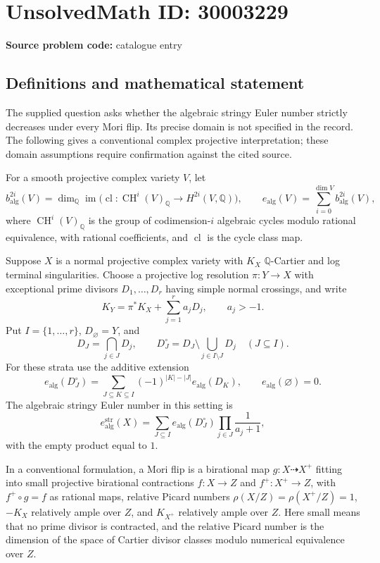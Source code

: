 \documentclass[11pt]{article}
\newcommand{\Q}{\mathbb{Q}}
\begin{document}
\section*{UnsolvedMath ID: 30003229}
\textbf{Source problem code:} catalogue entry
\subsection{Definitions and mathematical statement}
The supplied question asks whether the algebraic stringy Euler number strictly decreases under every Mori flip. Its precise domain is not specified in the record. The following gives a conventional complex projective interpretation; these domain assumptions require confirmation against the cited source.

For a smooth projective complex variety \(V\), let
\[
 b_{\mathrm{alg}}^{2i}(V)=\dim_{\Q}\operatorname{im}\bigl(\operatorname{cl}:\operatorname{CH}^{i}(V)_{\Q}\longrightarrow H^{2i}(V,\Q)\bigr),
 \qquad
 e_{\mathrm{alg}}(V)=\sum_{i=0}^{\dim V}b_{\mathrm{alg}}^{2i}(V),
\]
where \(\operatorname{CH}^{i}(V)_{\Q}\) is the group of codimension-\(i\) algebraic cycles modulo rational equivalence, with rational coefficients, and \(\operatorname{cl}\) is the cycle class map.

Suppose \(X\) is a normal projective complex variety with \(K_X\) \(\Q\)-Cartier and log terminal singularities. Choose a projective log resolution \(\pi:Y\to X\) with exceptional prime divisors \(D_1,\ldots,D_r\) having simple normal crossings, and write
\[
 K_Y=\pi^*K_X+\sum_{j=1}^{r}a_jD_j,\qquad a_j>-1.
\]
Put \(I=\{1,\ldots,r\}\), \(D_{\varnothing}=Y\), and
\[
 D_J=\bigcap_{j\in J}D_j,\qquad
 D_J^{\circ}=D_J\setminus\bigcup_{j\in I\setminus J}D_j
 \quad(J\subseteq I).
\]
For these strata use the additive extension
\[
 e_{\mathrm{alg}}(D_J^{\circ})
 =\sum_{J\subseteq K\subseteq I}(-1)^{|K|-|J|}e_{\mathrm{alg}}(D_K),
 \qquad e_{\mathrm{alg}}(\varnothing)=0.
\]
The algebraic stringy Euler number in this setting is
\[
 e_{\mathrm{alg}}^{\mathrm{str}}(X)
 =\sum_{J\subseteq I}e_{\mathrm{alg}}(D_J^{\circ})
   \prod_{j\in J}\frac{1}{a_j+1},
\]
with the empty product equal to \(1\).

In a conventional formulation, a Mori flip is a birational map \(g:X\dashrightarrow X^+\) fitting into small projective birational contractions \(f:X\to Z\) and \(f^+:X^+\to Z\), with \(f^+\circ g=f\) as rational maps, relative Picard numbers \(\rho(X/Z)=\rho(X^+/Z)=1\), \(-K_X\) relatively ample over \(Z\), and \(K_{X^+}\) relatively ample over \(Z\). Here small means that no prime divisor is contracted, and the relative Picard number is the dimension of the space of Cartier divisor classes modulo numerical equivalence over \(Z\).
\end{document}
